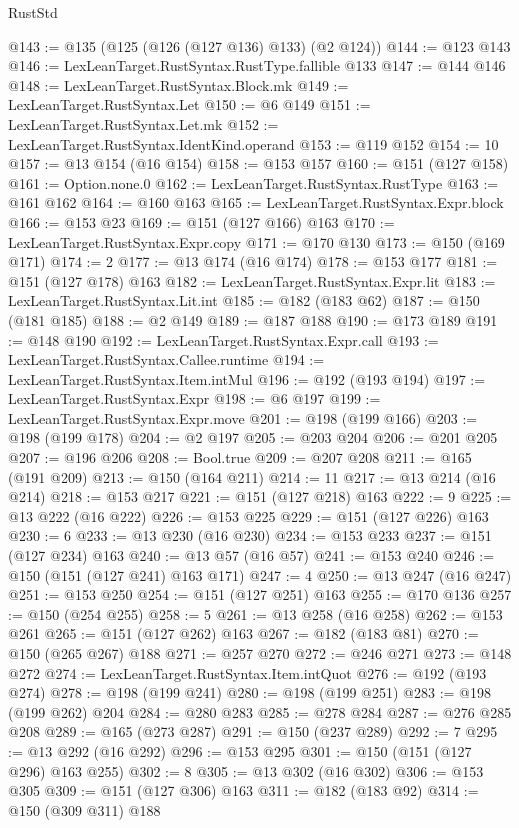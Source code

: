 \begin{lexlean}{RustStd}
\begin{coremodule}
@143 := @135 (@125 (@126 (@127 @136) @133) (@2 @124))
@144 := @123 @143
@146 := LexLeanTarget.RustSyntax.RustType.fallible @133
@147 := @144 @146
@148 := LexLeanTarget.RustSyntax.Block.mk
@149 := LexLeanTarget.RustSyntax.Let
@150 := @6 @149
@151 := LexLeanTarget.RustSyntax.Let.mk
@152 := LexLeanTarget.RustSyntax.IdentKind.operand
@153 := @119 @152
@154 := 10
@157 := @13 @154 (@16 @154)
@158 := @153 @157
@160 := @151 (@127 @158)
@161 := Option.none.{0}
@162 := LexLeanTarget.RustSyntax.RustType
@163 := @161 @162
@164 := @160 @163
@165 := LexLeanTarget.RustSyntax.Expr.block
@166 := @153 @23
@169 := @151 (@127 @166) @163
@170 := LexLeanTarget.RustSyntax.Expr.copy
@171 := @170 @130
@173 := @150 (@169 @171)
@174 := 2
@177 := @13 @174 (@16 @174)
@178 := @153 @177
@181 := @151 (@127 @178) @163
@182 := LexLeanTarget.RustSyntax.Expr.lit
@183 := LexLeanTarget.RustSyntax.Lit.int
@185 := @182 (@183 @62)
@187 := @150 (@181 @185)
@188 := @2 @149
@189 := @187 @188
@190 := @173 @189
@191 := @148 @190
@192 := LexLeanTarget.RustSyntax.Expr.call
@193 := LexLeanTarget.RustSyntax.Callee.runtime
@194 := LexLeanTarget.RustSyntax.Item.intMul
@196 := @192 (@193 @194)
@197 := LexLeanTarget.RustSyntax.Expr
@198 := @6 @197
@199 := LexLeanTarget.RustSyntax.Expr.move
@201 := @198 (@199 @166)
@203 := @198 (@199 @178)
@204 := @2 @197
@205 := @203 @204
@206 := @201 @205
@207 := @196 @206
@208 := Bool.true
@209 := @207 @208
@211 := @165 (@191 @209)
@213 := @150 (@164 @211)
@214 := 11
@217 := @13 @214 (@16 @214)
@218 := @153 @217
@221 := @151 (@127 @218) @163
@222 := 9
@225 := @13 @222 (@16 @222)
@226 := @153 @225
@229 := @151 (@127 @226) @163
@230 := 6
@233 := @13 @230 (@16 @230)
@234 := @153 @233
@237 := @151 (@127 @234) @163
@240 := @13 @57 (@16 @57)
@241 := @153 @240
@246 := @150 (@151 (@127 @241) @163 @171)
@247 := 4
@250 := @13 @247 (@16 @247)
@251 := @153 @250
@254 := @151 (@127 @251) @163
@255 := @170 @136
@257 := @150 (@254 @255)
@258 := 5
@261 := @13 @258 (@16 @258)
@262 := @153 @261
@265 := @151 (@127 @262) @163
@267 := @182 (@183 @81)
@270 := @150 (@265 @267) @188
@271 := @257 @270
@272 := @246 @271
@273 := @148 @272
@274 := LexLeanTarget.RustSyntax.Item.intQuot
@276 := @192 (@193 @274)
@278 := @198 (@199 @241)
@280 := @198 (@199 @251)
@283 := @198 (@199 @262) @204
@284 := @280 @283
@285 := @278 @284
@287 := @276 @285 @208
@289 := @165 (@273 @287)
@291 := @150 (@237 @289)
@292 := 7
@295 := @13 @292 (@16 @292)
@296 := @153 @295
@301 := @150 (@151 (@127 @296) @163 @255)
@302 := 8
@305 := @13 @302 (@16 @302)
@306 := @153 @305
@309 := @151 (@127 @306) @163
@311 := @182 (@183 @92)
@314 := @150 (@309 @311) @188

\end{coremodule}
\end{lexlean}
